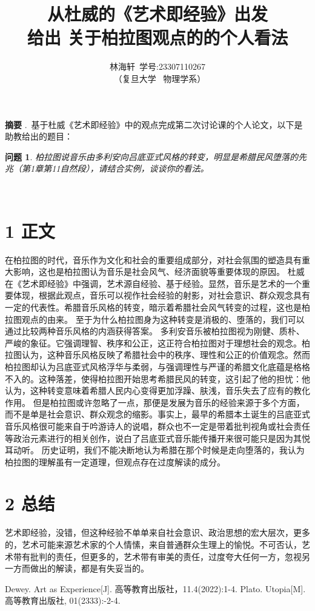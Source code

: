 \documentclass[twocolumn]{ctexart}
\title{从杜威的《艺术即经验》出发\\给出
	关于柏拉图观点的的个人看法}
\author{ 林海轩\ 学号:23307110267 \\\ （复旦大学 \ 物理学系）}
\date{\vspace{-2em}}
\begin{document}
	
	\maketitle
	
	\begin{strip}
		
		\noindent  \textbf{摘要} .\ 基于杜威《艺术即经验》中的观点完成第二次讨论课的个人论文，以下是助教给出的题目：
		\newtheorem*{lemma}{问题}
		\begin{lemma}
			柏拉图说音乐由多利安向吕底亚式风格的转变，明显是希腊民风堕落的先兆（第1章第11自然段），请结合实例，谈谈你的看法。
		\end{lemma}
		
		\\
	\end{strip}
	
	
	\section*{1  正文}
	
	在柏拉图的时代，音乐作为文化和社会的重要组成部分，对社会氛围的塑造具有重大影响，这也是柏拉图认为音乐是社会风气、经济面貌等重要体现的原因。
	杜威在《艺术即经验》中强调，艺术源自经验、基于经验。显然，音乐是艺术的一个重要体现，根据此观点，音乐可以视作社会经验的射影，对社会意识、群众观念具有一定的代表性。希腊音乐风格的转变，暗示着希腊社会风气转变的过程，这也是柏拉图观点的由来。
	至于为什么柏拉图身为这种转变是消极的、堕落的，我们可以通过比较两种音乐风格的内涵获得答案。
	多利安音乐被柏拉图视为刚健、质朴、严峻的象征。它强调理智、秩序和公正，这正符合柏拉图对于理想社会的观念。柏拉图认为，这种音乐风格反映了希腊社会中的秩序、理性和公正的价值观念。然而柏拉图却认为吕底亚式风格浮华与柔弱，与强调理性与严谨的希腊文化底蕴是格格不入的。这种落差，使得柏拉图开始思考希腊民风的转变，这引起了他的担忧：他认为，这种转变意味着希腊人民内心变得更加浮躁、肤浅，音乐失去了应有的教化作用。
	但是柏拉图或许忽略了一点，那便是发展为音乐的经验来源于多个方面，而不是单是社会意识、群众观念的缩影。事实上，最早的希腊本土诞生的吕底亚式音乐风格很可能来自于吟游诗人的说唱，群众也不一定是带着批判视角或社会责任等政治元素进行的相关创作，说白了吕底亚式音乐能传播开来很可能只是因为其悦耳动听。
	历史证明，我们不能决断地认为希腊在那个时候是走向堕落的，我认为柏拉图的理解虽有一定道理，但观点存在过度解读的成分。
	
	
	
	
	\section*{2 总结}
艺术即经验，没错，但这种经验不单单来自社会意识、政治思想的宏大层次，更多的，艺术可能来源艺术家的个人情愫，来自普通群众生理上的愉悦。不可否认，艺术带有批判的责任，但更多的，艺术带有审美的责任，过度夸大任何一方，忽视另一方而做出的解读，都是有失妥当的。




	
		\begin{thebibliography}{99}%
		Dewey. Art as Experience[J]. 高等教育出版社，11.4(2022):1-4.
		Plato. Utopia[M]. 高等教育出版社, 01(2333):-2-4.
	\end{thebibliography}
\end{document}
